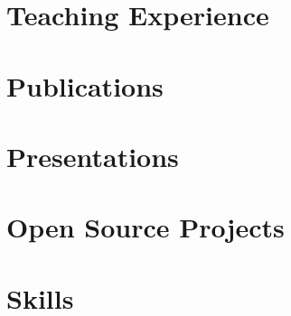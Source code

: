 \documentclass[a4paper,11pt]{article}
\begin{document}
    \section{Teaching Experience}
        \begin{itemize}
            \lecturer
                \cvItemizeBegin
                    \lecturerOne
                    \lecturerTwo
                \cvItemizeEnd
            \supervision
                \cvItemizeBegin
                    \supervisionOne
                    \supervisionTwo
                    \supervisionThree
                    \supervisionFour
                    \supervisionFive
                    \supervisionSix
                    \supervisionSeven
                \cvItemizeEnd
        \end{itemize}

    \section{Publications}
        \publicationItemizeBegin
            \publicationInCIT
            \publicationAAAI
            \publicationPopulationCoded
            \publicationSpikingTransformer
            \publicationRateCoded
            \publicationEncodingSurvey
            \publicationBernstainTwo
            \publicationDAICAFGR
            \publicationDAICANN
            \publicationBernsteinOne
            \publicationBernsteinDA
            \publicationReport
        \publicationItemizeEnd
 
    \section{Presentations}
        \presentations

    \section{Open Source Projects}
        \begin{itemize}
            \fossHPZ
                \cvItemizeBegin
                    \fossHPZOne
                    \fossHPZTwo
                    \fossHPZThree
                \cvItemizeEnd
            \fossConvSnn
                \cvItemizeBegin
                    \fossConvSnnOne
                    \fossConvSnnTwo
                \cvItemizeEnd
        \end{itemize}

    \section{Skills}
        \begin{itemize}
            \skillsProgramming
            \skillsLanguages
            \skillsInterests
        \end{itemize}
\end{document}
